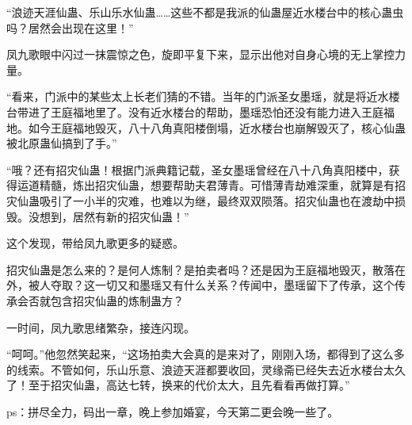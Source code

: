\begin{this_body}
“浪迹天涯仙蛊、乐山乐水仙蛊……这些不都是我派的仙蛊屋近水楼台中的核心蛊虫吗？居然会出现在这里！”

凤九歌眼中闪过一抹震惊之色，旋即平复下来，显示出他对自身心境的无上掌控力量。

“看来，门派中的某些太上长老们猜的不错。当年的门派圣女墨瑶，就是将近水楼台带进了王庭福地里了。没有近水楼台的帮助，墨瑶恐怕还没有能力进入王庭福地。如今王庭福地毁灭，八十八角真阳楼倒塌，近水楼台也崩解毁灭了，核心仙蛊被北原蛊仙搞到了手。”

“哦？还有招灾仙蛊！根据门派典籍记载，圣女墨瑶曾经在八十八角真阳楼中，获得运道精髓，炼出招灾仙蛊，想要帮助夫君薄青。可惜薄青劫难深重，就算是有招灾仙蛊吸引了一小半的灾难，也难以为继，最终双双陨落。招灾仙蛊也在渡劫中损毁。没想到，居然有新的招灾仙蛊！”

这个发现，带给凤九歌更多的疑惑。

招灾仙蛊是怎么来的？是何人炼制？是拍卖者吗？还是因为王庭福地毁灭，散落在外，被人夺取？这一切又和墨瑶又有什么关系？传闻中，墨瑶留下了传承，这个传承会否就包含招灾仙蛊的炼制蛊方？

一时间，凤九歌思绪繁杂，接连闪现。

“呵呵。”他忽然笑起来，“这场拍卖大会真的是来对了，刚刚入场，都得到了这么多的线索。不管如何，乐山乐意、浪迹天涯都要收回，灵缘斋已经失去近水楼台太久了！至于招灾仙蛊，高达七转，换来的代价太大，且先看看再做打算。”

ps：拼尽全力，码出一章，晚上参加婚宴，今天第二更会晚一些了。

\end{this_body}


